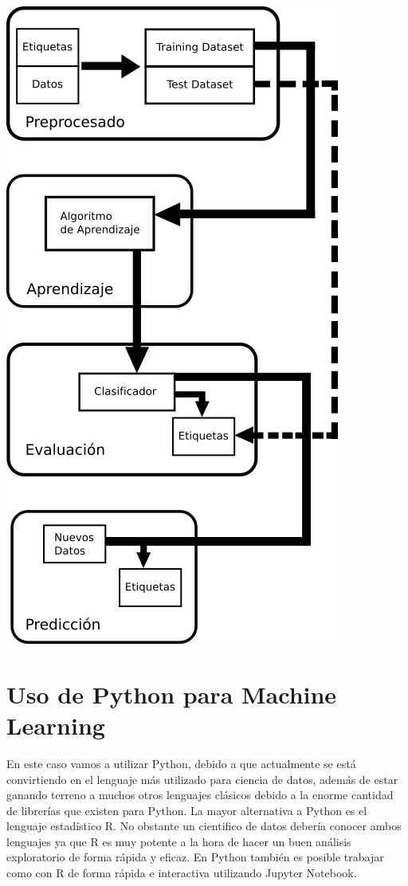 \begin{center}
\includegraphics[scale=0.7]{./img/workflow.png}
\end{center}

\pagebreak

\section{Uso de Python para Machine Learning}
En este caso vamos a utilizar Python, debido a que actualmente se está convirtiendo en el lenguaje más utilizado para ciencia de datos, además de estar ganando terreno a muchos otros lenguajes clásicos debido a la enorme cantidad de librerías que existen para Python.  
La mayor alternativa a Python es el lenguaje estadístico R.  
No obstante un cientifico de datos debería conocer ambos lenguajes ya que R es muy potente a la hora de hacer un buen análisis exploratorio de forma rápida y eficaz.  
En Python también es posible trabajar como con R de forma rápida e interactiva utilizando Jupyter Notebook.  

